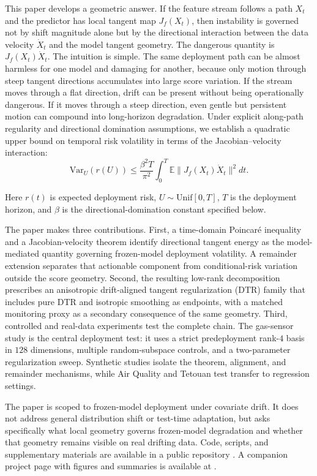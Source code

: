 \documentclass[conference]{IEEEtran}
\newcommand{\E}{\mathbb{E}}
\newcommand{\Var}{\mathrm{Var}}
\begin{document}
This paper develops a geometric answer. If the feature stream follows a path $X_t$ and the predictor has local tangent map $J_f(X_t)$, then instability is governed not by shift magnitude alone but by the directional interaction between the data velocity $\dot X_t$ and the model tangent geometry. The dangerous quantity is $J_f(X_t)\dot X_t$. The intuition is simple. The same deployment path can be almost harmless for one model and damaging for another, because only motion through steep tangent directions accumulates into large score variation. If the stream moves through a flat direction, drift can be present without being operationally dangerous. If it moves through a steep direction, even gentle but persistent motion can compound into long-horizon degradation. Under explicit along-path regularity and directional domination assumptions, we establish a quadratic upper bound on temporal risk volatility in terms of the Jacobian--velocity interaction:
\[
\Var_U(r(U)) \le \frac{\beta^2 T}{\pi^2}\int_0^T \E\|J_f(X_t)\dot X_t\|^2dt.
\]

Here $r(t)$ is expected deployment risk, $U\sim\mathrm{Unif}[0,T]$, $T$ is the deployment horizon, and $\beta$ is the directional-domination constant specified below.

The paper makes three contributions. First, a time-domain Poincar\'e inequality and a Jacobian-velocity theorem identify directional tangent energy as the model-mediated quantity governing frozen-model deployment volatility. A remainder extension separates that actionable component from conditional-risk variation outside the score geometry. Second, the resulting low-rank decomposition prescribes an anisotropic drift-aligned tangent regularization (DTR) family that includes pure DTR and isotropic smoothing as endpoints, with a matched monitoring proxy as a secondary consequence of the same geometry. Third, controlled and real-data experiments test the complete chain. The gas-sensor study is the central deployment test: it uses a strict predeployment rank-$4$ basis in $128$ dimensions, multiple random-subspace controls, and a two-parameter regularization sweep. Synthetic studies isolate the theorem, alignment, and remainder mechanisms, while Air Quality and Tetouan test transfer to regression settings.

The paper is scoped to frozen-model deployment under covariate drift. It does not address general distribution shift or test-time adaptation, but asks specifically what local geometry governs frozen-model degradation and whether that geometry remains visible on real drifting data.
Code, scripts, and supplementary materials are available in a public repository \cite{landers-repo}. A companion project page with figures and summaries is available at \cite{landers-site}.
\end{document}
